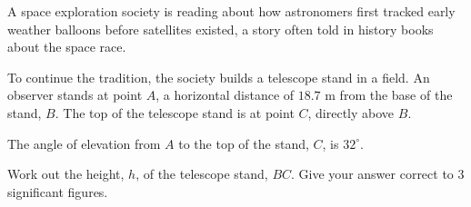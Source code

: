 \begin{question}
\noindent A space exploration society is reading about how astronomers first tracked early weather balloons before satellites existed, a story often told in history books about the space race.

To continue the tradition, the society builds a telescope stand in a field. An observer stands at point $A$, a horizontal distance of $18.7$ m from the base of the stand, $B$. The top of the telescope stand is at point $C$, directly above $B$.

The angle of elevation from $A$ to the top of the stand, $C$, is $32^{\circ}$.

\begin{center}
\end{center}

\noindent Work out the height, $h$, of the telescope stand, $BC$.
Give your answer correct to 3 significant figures.

\vspace{4.5cm}

\begin{flushright}
\end{flushright}
\end{question}